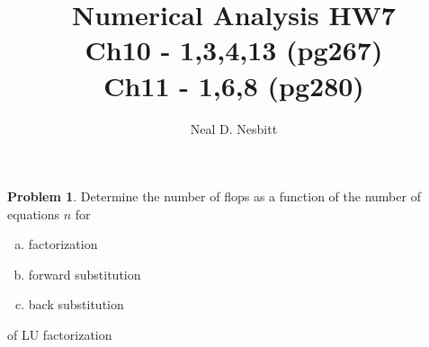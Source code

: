 \documentclass{article}
\title{Numerical Analysis HW7\\
Ch10 - 1,3,4,13 (pg267)\\
Ch11 - 1,6,8 (pg280)\\}
\author{Neal D. Nesbitt}
\begin{document}
\maketitle

\theoremstyle{definition}
\newtheorem{problem}{Problem}
\newtheorem{solution}{Solution}[problem]


\begin{problem}
Determine the number of flops as a function of the number of equations $n$ for
\begin{enumerate}[(a)]
\item factorization
\item forward substitution
\item back substitution
\end{enumerate}
of LU factorization
\end{problem}
\end{document}
